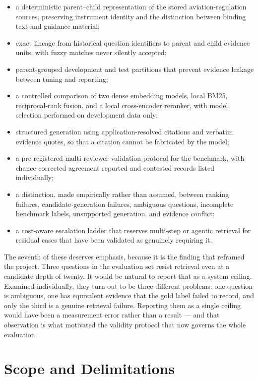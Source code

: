 \begin{itemize}
  \item a deterministic parent--child representation of the stored aviation-regulation sources, preserving instrument identity and the distinction between binding text and guidance material;
  \item exact lineage from historical question identifiers to parent and child evidence units, with fuzzy matches never silently accepted;
  \item parent-grouped development and test partitions that prevent evidence leakage between tuning and reporting;
  \item a controlled comparison of two dense embedding models, local BM25, reciprocal-rank fusion, and a local cross-encoder reranker, with model selection performed on development data only;
  \item structured generation using application-resolved citations and verbatim evidence quotes, so that a citation cannot be fabricated by the model;
  \item a pre-registered multi-reviewer validation protocol for the benchmark, with chance-corrected agreement reported and contested records listed individually;
  \item a distinction, made empirically rather than assumed, between ranking failures, candidate-generation failures, ambiguous questions, incomplete benchmark labels, unsupported generation, and evidence conflict;
  \item a cost-aware escalation ladder that reserves multi-step or agentic retrieval for residual cases that have been validated as genuinely requiring it.
\end{itemize}

The seventh of these deserves emphasis, because it is the finding that reframed the project. Three questions in the evaluation set resist retrieval even at a candidate depth of twenty. It would be natural to report that as a system ceiling. Examined individually, they turn out to be three different problems: one question is ambiguous, one has equivalent evidence that the gold label failed to record, and only the third is a genuine retrieval failure. Reporting them as a single ceiling would have been a measurement error rather than a result --- and that observation is what motivated the validity protocol that now governs the whole evaluation.

\section{Scope and Delimitations}
\label{sec:intro-scope}

